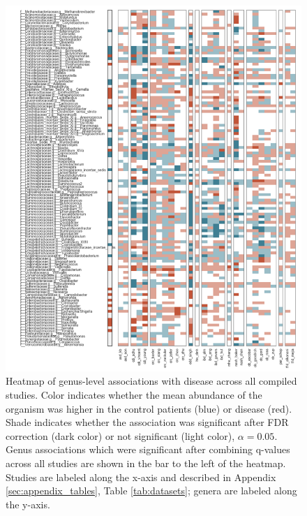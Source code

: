 \documentclass[12pt]{article}
\begin{document}
\newpage
\begin{figure}[h]
	\begin{center}
  	\includegraphics[scale=1.2]{pval_heatmap}
	\caption{Heatmap of genus-level associations with disease across all
	compiled studies. Color indicates whether the mean abundance of the organism
	was higher in the control patients (blue) or disease (red). Shade indicates
	whether the association was significant after FDR correction (dark color) or not
	significant (light color), $\alpha = 0.05$. Genus associations which were 
	significant	after combining q-values across all studies are shown in the bar to 	
	the left of the heatmap. Studies are labeled along the x-axis and described in
	Appendix \ref{sec:appendix_tables}, Table \ref{tab:datasets}; genera are labeled 
	along the y-axis.}
	\label{fig:larger_pval_heatmap}
	\end{center}
\end{figure}

\FloatBarrier

\newpage




\end{document}
